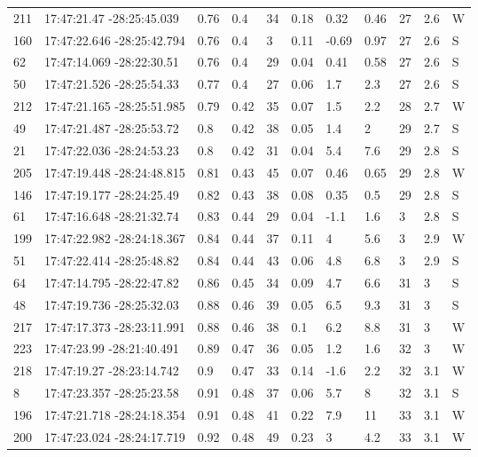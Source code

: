\begin{deluxetable}[htp]
\begin{tabular}{lllllllllll}
211 & 17:47:21.47 -28:25:45.039 & 0.76 & 0.4 & 34 & 0.18 & 0.32 & 0.46 & 27 & 2.6\ee{24} & W \\
160 & 17:47:22.646 -28:25:42.794 & 0.76 & 0.4 & 3 & 0.11 & -0.69 & 0.97 & 27 & 2.6\ee{24} & S \\
62 & 17:47:14.069 -28:22:30.51 & 0.76 & 0.4 & 29 & 0.04 & 0.41 & 0.58 & 27 & 2.6\ee{24} & S \\
50 & 17:47:21.526 -28:25:54.33 & 0.77 & 0.4 & 27 & 0.06 & 1.7 & 2.3 & 27 & 2.6\ee{24} & S \\
212 & 17:47:21.165 -28:25:51.985 & 0.79 & 0.42 & 35 & 0.07 & 1.5 & 2.2 & 28 & 2.7\ee{24} & W \\
49 & 17:47:21.487 -28:25:53.72 & 0.8 & 0.42 & 38 & 0.05 & 1.4 & 2 & 29 & 2.7\ee{24} & S \\
21 & 17:47:22.036 -28:24:53.23 & 0.8 & 0.42 & 31 & 0.04 & 5.4 & 7.6 & 29 & 2.8\ee{24} & S \\
205 & 17:47:19.448 -28:24:48.815 & 0.81 & 0.43 & 45 & 0.07 & 0.46 & 0.65 & 29 & 2.8\ee{24} & W \\
146 & 17:47:19.177 -28:24:25.49 & 0.82 & 0.43 & 38 & 0.08 & 0.35 & 0.5 & 29 & 2.8\ee{24} & S \\
61 & 17:47:16.648 -28:21:32.74 & 0.83 & 0.44 & 29 & 0.04 & -1.1 & 1.6 & 3 & 2.8\ee{24} & S \\
199 & 17:47:22.982 -28:24:18.367 & 0.84 & 0.44 & 37 & 0.11 & 4 & 5.6 & 3 & 2.9\ee{24} & W \\
51 & 17:47:22.414 -28:25:48.82 & 0.84 & 0.44 & 43 & 0.06 & 4.8 & 6.8 & 3 & 2.9\ee{24} & S \\
64 & 17:47:14.795 -28:22:47.82 & 0.86 & 0.45 & 34 & 0.09 & 4.7 & 6.6 & 31 & 3\ee{24} & S \\
48 & 17:47:19.736 -28:25:32.03 & 0.88 & 0.46 & 39 & 0.05 & 6.5 & 9.3 & 31 & 3\ee{24} & S \\
217 & 17:47:17.373 -28:23:11.991 & 0.88 & 0.46 & 38 & 0.1 & 6.2 & 8.8 & 31 & 3\ee{24} & W \\
223 & 17:47:23.99 -28:21:40.491 & 0.89 & 0.47 & 36 & 0.05 & 1.2 & 1.6 & 32 & 3\ee{24} & W \\
218 & 17:47:19.27 -28:23:14.742 & 0.9 & 0.47 & 33 & 0.14 & -1.6 & 2.2 & 32 & 3.1\ee{24} & W \\
8 & 17:47:23.357 -28:25:23.58 & 0.91 & 0.48 & 37 & 0.06 & 5.7 & 8 & 32 & 3.1\ee{24} & S \\
196 & 17:47:21.718 -28:24:18.354 & 0.91 & 0.48 & 41 & 0.22 & 7.9 & 11 & 33 & 3.1\ee{24} & W \\
200 & 17:47:23.024 -28:24:17.719 & 0.92 & 0.48 & 49 & 0.23 & 3 & 4.2 & 33 & 3.1\ee{24} & W \\

\end{tabular}
\end{deluxetable}

